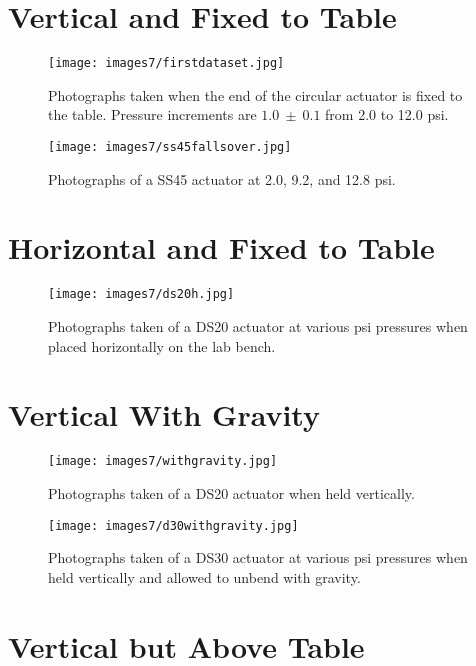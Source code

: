 \section{Vertical and Fixed to Table}

\begin{figure}[!ht]
    \centering
     \texttt{[image: images7/firstdataset.jpg]}
    \caption{Photographs taken when the end of the circular actuator is fixed to the table. Pressure increments are $1.0~\pm~0.1$ from 2.0 to 12.0 psi.}
    \label{fig:firstdataset}
\end{figure}

\begin{figure}[!ht]
    \centering
     \texttt{[image: images7/ss45fallsover.jpg]}
    \caption{Photographs of a SS45 actuator at 2.0, 9.2, and 12.8 psi.}
    \label{fig:ss45fallsover}
\end{figure}

\clearpage
\section{Horizontal and Fixed to Table}

\begin{figure}[!ht]
    \centering
     \texttt{[image: images7/ds20h.jpg]}
    \caption{Photographs taken of a DS20 actuator at various psi pressures when placed horizontally on the lab bench.}
    \label{fig:ds20h}
\end{figure}

\clearpage
\section{Vertical With Gravity}
\begin{figure}[!ht]
    \centering
     \texttt{[image: images7/withgravity.jpg]}
    \caption{Photographs taken of a DS20 actuator when held vertically.}
    \label{fig:withgravity}
\end{figure}

\begin{figure}[!ht]
    \centering
     \texttt{[image: images7/d30withgravity.jpg]}
    \caption{Photographs taken of a DS30 actuator at various psi pressures when held vertically and allowed to unbend with gravity.}
    \label{fig:d30withgravity}
\end{figure}

\clearpage
\section{Vertical but Above Table}

